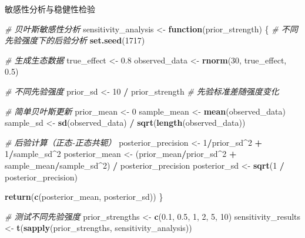 \documentclass[
]{book}
\newenvironment{Shaded}{\begin{snugshade}}{\end{snugshade}}
\newcommand{\CommentTok}[1]{\textcolor[rgb]{0.56,0.35,0.01}{\textit{#1}}}
\newcommand{\ControlFlowTok}[1]{\textcolor[rgb]{0.13,0.29,0.53}{\textbf{#1}}}
\newcommand{\DecValTok}[1]{\textcolor[rgb]{0.00,0.00,0.81}{#1}}
\newcommand{\FloatTok}[1]{\textcolor[rgb]{0.00,0.00,0.81}{#1}}
\newcommand{\FunctionTok}[1]{\textcolor[rgb]{0.13,0.29,0.53}{\textbf{#1}}}
\newcommand{\NormalTok}[1]{#1}
\newcommand{\OtherTok}[1]{\textcolor[rgb]{0.56,0.35,0.01}{#1}}
\newcommand{\SpecialCharTok}[1]{\textcolor[rgb]{0.81,0.36,0.00}{\textbf{#1}}}
\begin{document}
敏感性分析与稳健性检验

\begin{Shaded}
\begin{Highlighting}[]
\CommentTok{\# 贝叶斯敏感性分析}
\NormalTok{sensitivity\_analysis }\OtherTok{\textless{}{-}} \ControlFlowTok{function}\NormalTok{(prior\_strength) \{}
  \CommentTok{\# 不同先验强度下的后验分析}
  \FunctionTok{set.seed}\NormalTok{(}\DecValTok{1717}\NormalTok{)}

  \CommentTok{\# 生成生态数据}
\NormalTok{  true\_effect }\OtherTok{\textless{}{-}} \FloatTok{0.8}
\NormalTok{  observed\_data }\OtherTok{\textless{}{-}} \FunctionTok{rnorm}\NormalTok{(}\DecValTok{30}\NormalTok{, true\_effect, }\FloatTok{0.5}\NormalTok{)}

  \CommentTok{\# 不同先验强度}
\NormalTok{  prior\_sd }\OtherTok{\textless{}{-}} \DecValTok{10} \SpecialCharTok{/}\NormalTok{ prior\_strength  }\CommentTok{\# 先验标准差随强度变化}

  \CommentTok{\# 简单贝叶斯更新}
\NormalTok{  prior\_mean }\OtherTok{\textless{}{-}} \DecValTok{0}
\NormalTok{  sample\_mean }\OtherTok{\textless{}{-}} \FunctionTok{mean}\NormalTok{(observed\_data)}
\NormalTok{  sample\_sd }\OtherTok{\textless{}{-}} \FunctionTok{sd}\NormalTok{(observed\_data) }\SpecialCharTok{/} \FunctionTok{sqrt}\NormalTok{(}\FunctionTok{length}\NormalTok{(observed\_data))}

  \CommentTok{\# 后验计算（正态{-}正态共轭）}
\NormalTok{  posterior\_precision }\OtherTok{\textless{}{-}} \DecValTok{1}\SpecialCharTok{/}\NormalTok{prior\_sd}\SpecialCharTok{\^{}}\DecValTok{2} \SpecialCharTok{+} \DecValTok{1}\SpecialCharTok{/}\NormalTok{sample\_sd}\SpecialCharTok{\^{}}\DecValTok{2}
\NormalTok{  posterior\_mean }\OtherTok{\textless{}{-}}\NormalTok{ (prior\_mean}\SpecialCharTok{/}\NormalTok{prior\_sd}\SpecialCharTok{\^{}}\DecValTok{2} \SpecialCharTok{+}\NormalTok{ sample\_mean}\SpecialCharTok{/}\NormalTok{sample\_sd}\SpecialCharTok{\^{}}\DecValTok{2}\NormalTok{) }\SpecialCharTok{/}\NormalTok{ posterior\_precision}
\NormalTok{  posterior\_sd }\OtherTok{\textless{}{-}} \FunctionTok{sqrt}\NormalTok{(}\DecValTok{1} \SpecialCharTok{/}\NormalTok{ posterior\_precision)}

  \FunctionTok{return}\NormalTok{(}\FunctionTok{c}\NormalTok{(posterior\_mean, posterior\_sd))}
\NormalTok{\}}

\CommentTok{\# 测试不同先验强度}
\NormalTok{prior\_strengths }\OtherTok{\textless{}{-}} \FunctionTok{c}\NormalTok{(}\FloatTok{0.1}\NormalTok{, }\FloatTok{0.5}\NormalTok{, }\DecValTok{1}\NormalTok{, }\DecValTok{2}\NormalTok{, }\DecValTok{5}\NormalTok{, }\DecValTok{10}\NormalTok{)}
\NormalTok{sensitivity\_results }\OtherTok{\textless{}{-}} \FunctionTok{t}\NormalTok{(}\FunctionTok{sapply}\NormalTok{(prior\_strengths, sensitivity\_analysis))}


\end{Highlighting}
\end{Shaded}
\end{document}
